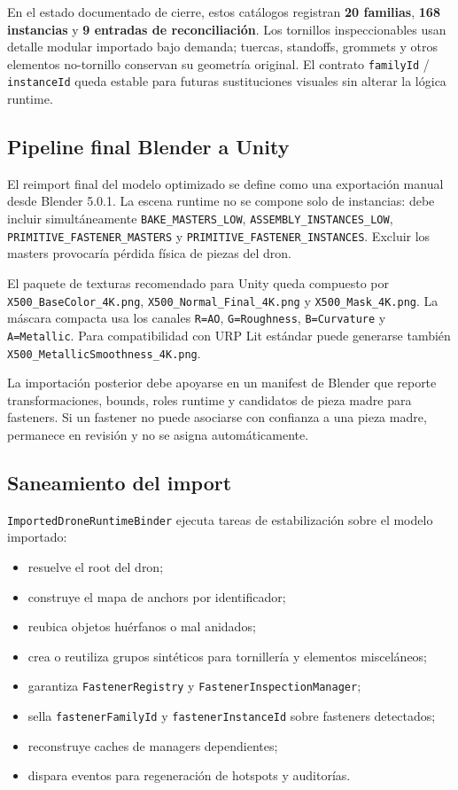 \documentclass[12pt,letterpaper]{article}
\begin{document}
\noindent En el estado documentado de cierre, estos catálogos registran \textbf{20 familias}, \textbf{168 instancias} y \textbf{9 entradas de reconciliación}. Los tornillos inspeccionables usan detalle modular importado bajo demanda; tuercas, standoffs, grommets y otros elementos no-tornillo conservan su geometría original. El contrato \texttt{familyId} / \texttt{instanceId} queda estable para futuras sustituciones visuales sin alterar la lógica runtime.

\subsection{Pipeline final Blender a Unity}
El reimport final del modelo optimizado se define como una exportación manual desde Blender 5.0.1. La escena runtime no se compone solo de instancias: debe incluir simultáneamente \texttt{BAKE\_MASTERS\_LOW}, \texttt{ASSEMBLY\_INSTANCES\_LOW}, \texttt{PRIMITIVE\_FASTENER\_MASTERS} y \texttt{PRIMITIVE\_FASTENER\_INSTANCES}. Excluir los masters provocaría pérdida física de piezas del dron.

\noindent El paquete de texturas recomendado para Unity queda compuesto por \texttt{X500\_BaseColor\_4K.png}, \texttt{X500\_Normal\_Final\_4K.png} y \texttt{X500\_Mask\_4K.png}. La máscara compacta usa los canales \texttt{R=AO}, \texttt{G=Roughness}, \texttt{B=Curvature} y \texttt{A=Metallic}. Para compatibilidad con URP Lit estándar puede generarse también \texttt{X500\_MetallicSmoothness\_4K.png}.

\noindent La importación posterior debe apoyarse en un manifest de Blender que reporte transformaciones, bounds, roles runtime y candidatos de pieza madre para fasteners. Si un fastener no puede asociarse con confianza a una pieza madre, permanece en revisión y no se asigna automáticamente.

\subsection{Saneamiento del import}
\texttt{ImportedDroneRuntimeBinder} ejecuta tareas de estabilización sobre el modelo importado:
\begin{itemize}
    \item resuelve el root del dron;
    \item construye el mapa de anchors por identificador;
    \item reubica objetos huérfanos o mal anidados;
    \item crea o reutiliza grupos sintéticos para tornillería y elementos misceláneos;
    \item garantiza \texttt{FastenerRegistry} y \texttt{FastenerInspectionManager};
    \item sella \texttt{fastenerFamilyId} y \texttt{fastenerInstanceId} sobre fasteners detectados;
    \item reconstruye caches de managers dependientes;
    \item dispara eventos para regeneración de hotspots y auditorías.
\end{itemize}
\end{document}

